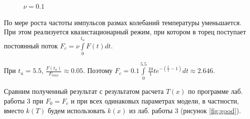 \documentclass[a4paper,14pt]{article}
\begin{document}
\begin{figure}[!h]
	\caption{$\nu = 0.1$}
	\label{fig:end}
\end{figure}

По мере роста частоты импульсов размах колебаний
температуры уменьшается. При этом
реализуется квазистационарный режим, при котором 
в торец поступает постоянный поток $F_c = \nu \int \limits_0^{t_u} F(t) dt$.

При $t_u = 5.5$, $\frac{F(t_u)}{F_{max}} \approx 0.05$.
Поэтому $F_c = 0.1 \int \limits_0^{5.5} \frac{10}{1} t e^{-(\frac{t}{1} - 1)} dt \approx 2.646$.

Сравним полученный результат с результатом расчета $T(x)$ по программе лаб. работы 3 при $F_0=F_c$
и при всех одинаковых параметрах модели, 
в частности, вместо $k(T)$ будем использовать $k(x)$ из лаб. работы 3 
(рисунок \ref{fig:good}).
\end{document}

